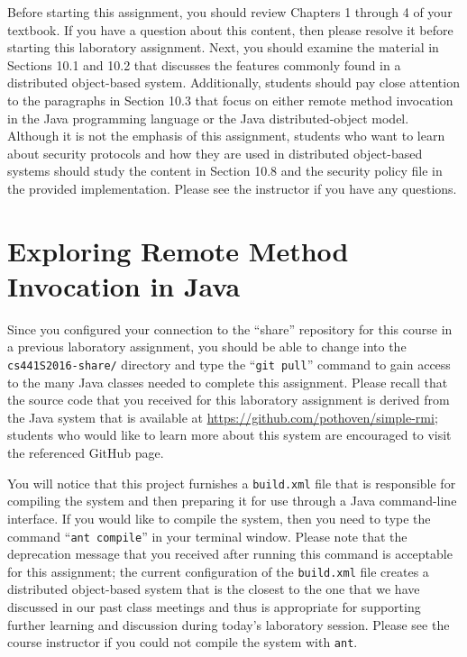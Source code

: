 Before starting this assignment, you should review Chapters 1 through 4 of your textbook. If you have a question about
this content, then please resolve it before starting this laboratory assignment. Next, you should examine the material
in Sections 10.1 and 10.2 that discusses the features commonly found in a distributed object-based system. Additionally,
students should pay close attention to the paragraphs in Section 10.3 that focus on either remote method invocation in the Java
programming language or the Java distributed-object model. Although it is not the emphasis of this assignment, students
who want to learn about security protocols and how they are used in distributed object-based systems should study the
content in Section 10.8 and the security policy file in the provided implementation.  Please see the instructor if you
have any questions.

\section*{Exploring Remote Method Invocation in Java}

Since you configured your connection to the ``share'' repository for this course in a previous laboratory assignment,
you should be able to change into the {\tt cs441S2016-share/} directory and type the ``{\tt git pull}'' command to gain
access to the many Java classes needed to complete this assignment. Please recall that the source code that you received
for this laboratory assignment is derived from the Java system that is available at
\url{https://github.com/pothoven/simple-rmi}; students who would like to learn more about this system are encouraged to
visit the referenced GitHub page.

You will notice that this project furnishes a {\tt build.xml} file that is responsible for compiling the system and then
preparing it for use through a Java command-line interface. If you would like to compile the system, then you need to
type the command ``{\tt ant compile}'' in your terminal window. Please note that the deprecation message that you
received after running this command is acceptable for this assignment; the current configuration of the {\tt build.xml}
file creates a distributed object-based system that is the closest to the one that we have discussed in our past class
meetings and thus is appropriate for supporting further learning and discussion during today's laboratory session.
Please see the course instructor if you could not compile the system with {\tt ant}.

